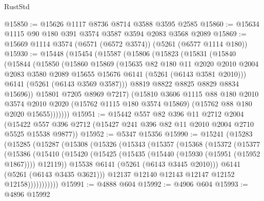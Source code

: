 \begin{lexlean}{RustStd}
\begin{coremodule}
@15850 := @15626 @1117 @8736 @8714 @3588 @3595 @2585
@15860 := @15634 @1115 @90 @180 @391 @3574 @3587 @3594 @2083 @3568 @2089
@15869 := @15669 @1114 @3574 (@6571 (@6572 @3574)) (@5261 (@6577 @1114 @180))
@15930 := @15448
    (@15454
      (@15587
        (@15806
          (@15823
            (@15831
              (@15840
                (@15844
                  (@15850
                    (@15860
                      @15869
                      (@15635
                        @82
                        @180
                        @11
                        @2020
                        @2010
                        @2004
                        @2083
                        @3580
                        @2089
                        @15655
                        @15676
                        @6141
                        (@5261 (@6143 @3581 @2010)))
                      @6141
                      (@5261 (@6143 @3569 @3587)))
                    @8819
                    @8822
                    @8825
                    @8829
                    @8834
                    @15696))
                @15801
                @7205
                @8969
                @7217)
              (@15810
                @3606
                @1115
                @88
                @180
                @2010
                @3574
                @2010
                @2020
                (@15762 @1115 @180 @3574 @15869)
                (@15762 @88 @180 @2020 @15655)))))))
@15951 := @15442
    @557
    @82
    @396
    @11
    @2712
    @2004
    (@15422 @557 @396 @2712 (@15427 @241 @396 @82 @11 @2010 @2004 @2710 @5525 @15538 @9877))
@15952 := @5347 @15356
@15990 := @15241
    (@15283
      (@15285
        (@15287
          (@15308
            (@15326
              (@15343
                (@15357
                  (@15368
                    (@15372
                      (@15377
                        (@15386
                          (@15410
                            (@15420
                              (@15425 (@15435 (@15440 (@15930 (@15951 (@15952 @1867)))) @12119))
                              @15538
                              @6141
                              (@5261 (@6143 @3445 @2010)))
                            @6141
                            (@5261 (@6143 @3435 @3621)))
                          @12137
                          @12140
                          @12143
                          @12147
                          @12152
                          @12158)))))))))))
@15991 := @4888 @604
@15992 := @4906 @604
@15993 := @4896 @15992

\end{coremodule}
\end{lexlean}
